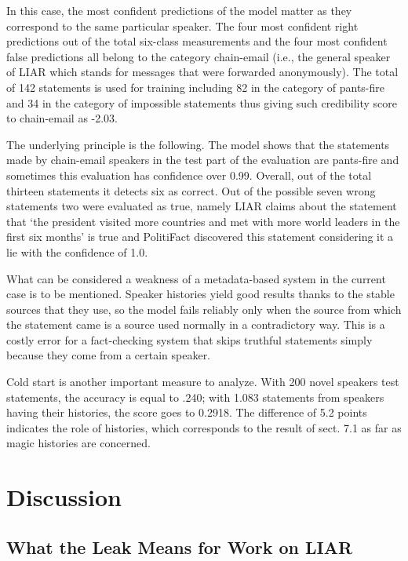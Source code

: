 \documentclass[10pt,twocolumn,twoside,a4paper]{article}
\begin{document}
In this case, the most confident predictions of the model matter as they correspond to the same particular speaker. The four most confident right predictions out of the total six-class measurements and the four most confident false predictions all belong to the category chain-email (i.e., the general speaker of LIAR which stands for messages that were forwarded anonymously). The total of 142 statements is used for training including 82 in the category of pants-fire and 34 in the category of impossible statements thus giving such credibility score to chain-email as -2.03.

The underlying principle is the following. The model shows that the statements made by chain-email speakers in the test part of the evaluation are pants-fire and sometimes this evaluation has confidence over 0.99. Overall, out of the total thirteen statements it detects six as correct. Out of the possible seven wrong statements two were evaluated as true, namely LIAR claims about the statement that `the president visited more countries and met with more world leaders in the first six months' is true and PolitiFact discovered this statement considering it a lie with the confidence of 1.0.

What can be considered a weakness of a metadata-based system in the current case is to be mentioned. Speaker histories yield good results thanks to the stable sources that they use, so the model fails reliably only when the source from which the statement came is a source used normally in a contradictory way. This is a costly error for a fact-checking system that skips truthful statements simply because they come from a certain speaker.

Cold start is another important measure to analyze. With 200 novel speakers test statements, the accuracy is equal to .240; with 1.083 statements from speakers having their histories, the score goes to 0.2918. The difference of 5.2 points indicates the role of histories, which corresponds to the result of sect. 7.1 as far as magic histories are concerned.

\section{Discussion}

\subsection{What the Leak Means for Work on LIAR}
\end{document}
